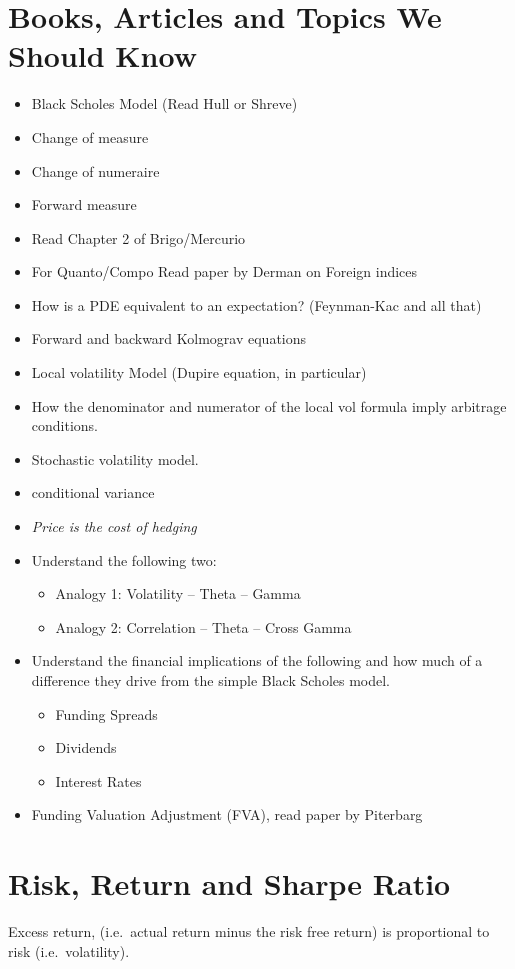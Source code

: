 \documentclass{amsart}
\theoremstyle{plain}
\numberwithin{equation}{section}
\begin{document}
\section{Books, Articles and Topics We Should Know}
\begin{itemize}
	\item Black Scholes Model (Read Hull or Shreve)
	\item Change of measure
	\item Change of numeraire
	\item Forward measure
	\item Read Chapter 2 of Brigo/Mercurio
	\item For Quanto/Compo Read paper by Derman on Foreign indices
	\item How is a PDE equivalent to an expectation? (Feynman-Kac and all that)
	\item Forward and backward Kolmograv equations
	\item Local volatility Model (Dupire equation, in particular)
	\item How the denominator and numerator of the local vol formula
	imply arbitrage conditions.
	\item Stochastic volatility model.
	\item conditional variance
	\item \emph{Price is the cost of hedging}
	\item Understand the following two:
		\begin{itemize}
			\item Analogy 1: Volatility -- Theta -- Gamma
			\item Analogy 2: Correlation -- Theta -- Cross Gamma
		\end{itemize}	
	\item Understand the financial implications of the following
	and how much of a difference they drive from the simple Black Scholes model.
		\begin{itemize}
			\item Funding Spreads
			\item Dividends
			\item Interest Rates			
		\end{itemize}	
	\item Funding Valuation Adjustment (FVA), read paper by Piterbarg
\end{itemize}

\section{Risk, Return and Sharpe Ratio}
Excess return, (i.e.\ actual return minus the 
risk free return) is proportional to risk (i.e.\ volatility).
\end{document}
